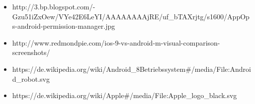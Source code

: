 \begin{frame}
\begin{itemize}
  \item{http://3.bp.blogspot.com/-Gzu51iZxOew/VYe42E6LeYI/AAAAAAAAjRE/uf_bTAXrjtg/s1600/AppOps-android-permission-manager.jpg}
  \item{http://www.redmondpie.com/ios-9-vs-android-m-visual-comparison-screenshots/}
  \item{https://de.wikipedia.org/wiki/Android_\28Betriebssystem#/media/File:Android_robot.svg}
  \item{https://de.wikipedia.org/wiki/Apple#/media/File:Apple_logo_black.svg}
\end{itemize}
\end{frame}
